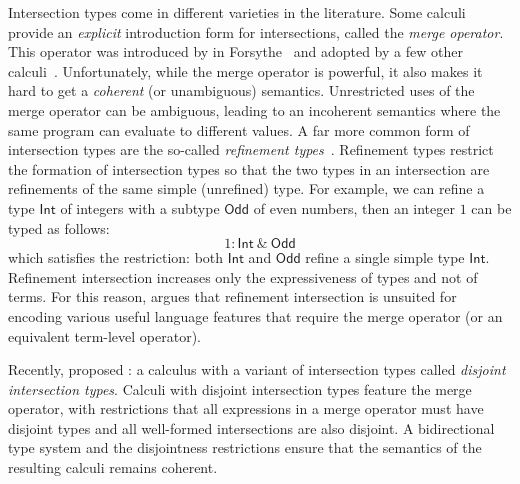Intersection types come in different varieties in the literature. Some calculi
provide an \emph{explicit} introduction form for intersections, called the
\emph{merge operator}. This operator was introduced by \citeauthor{reynolds1988preliminary} in Forsythe~\citep{reynolds1988preliminary} and
adopted by a few other calculi~\citep{Castagna_1992, dunfield2014elaborating, oliveira2016disjoint, alpuimdisjoint}. Unfortunately,
while the merge operator is powerful, it also makes it hard to get a \emph{coherent}
(or unambiguous) semantics.
Unrestricted uses of the merge operator can be ambiguous, leading to an incoherent semantics
where the same program can evaluate to different values.
A far more common form of intersection types are the so-called \emph{refinement
  types}~\citep{Freeman_1991, Davies_2000, dunfield2003type}. Refinement types
restrict the formation of intersection types so that the two types in an
intersection are refinements of the same simple (unrefined) type. For example,
we can refine a type $\mathsf{Int}$ of integers with a subtype $\mathsf{Odd}$ of
even numbers, then an integer $1$ can be typed as follows:
\[
  1 : \mathsf{Int}\ \& \ \mathsf{Odd}
\]
which satisfies the restriction: both $\mathsf{Int}$ and $\mathsf{Odd}$ refine a
single simple type $\mathsf{Int}$. Refinement intersection increases only the
expressiveness of types and not of terms. For this reason,
\citet{dunfield2014elaborating} argues that refinement intersection is unsuited
for encoding various useful language features that require the merge operator
(or an equivalent term-level operator).


Recently, \citet{oliveira2016disjoint} proposed \oname: a calculus with a variant of intersection types
called \emph{disjoint intersection types}.
Calculi with disjoint intersection types feature the merge
operator, with restrictions that all expressions in a merge
operator must have disjoint types and all well-formed intersections
are also disjoint. A bidirectional type system and the disjointness restrictions
ensure that the semantics of the resulting calculi remains
coherent.

\begin{comment}
The merge operator was introduced by Reynolds
and Forsythe and adopted by a few other calculi as well~\citep{}.
Unfortunately, while the merge operator is powerful, it makes
it hard to get a \emph{coherent} semantics. \bruno{what is coherence}
Perhaps because
of this issue the merge operator has not been adopted by
many language designs. Disjoint intersection types provide
a remedy for the coherence problem, by imposing restrictions
on the uses of merges and on the formation of intersection types.
\bruno{merge operator ==> models inheritance; intersection types ==>
model subtyping}

In essence disjoint intersection types retain most of the
expressive power of the merge operator.
For example, they can
be used to model powerful forms of extensible records~\citep{}.
\end{comment}

